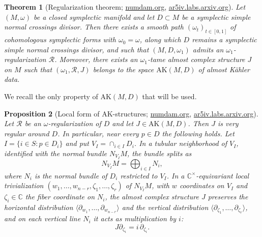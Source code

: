 \documentclass[11pt]{article}
\newtheorem{theorem}{Theorem}[section]
\newtheorem{proposition}[theorem]{Proposition}
\begin{document}
\begin{theorem}[Regularization theorem; {\rm\href{https://www.numdam.org/item/10.1016/j.crma.2018.02.009.pdf}{numdam.org}}, \href{https://ar5iv.labs.arxiv.org/html/2112.13125}{ar5iv.labs.arxiv.org}]\label{thm:reg}
Let $(M,\omega)$ be a closed symplectic manifold and let $D\subset M$ be a symplectic simple normal crossings divisor. Then there exists a smooth path $(\omega_t)_{t\in[0,1]}$ of cohomologous symplectic forms with $\omega_0=\omega$, along which $D$ remains a symplectic simple normal crossings divisor, and such that $(M,D,\omega_1)$ admits an $\omega_1$-regularization $\mathcal R$. Moreover, there exists an $\omega_1$-tame almost complex structure $J$ on $M$ such that $(\omega_1,\mathcal R,J)$ belongs to the space $\mathrm{AK}(M,D)$ of almost Kähler data.
\end{theorem}

We recall the only property of $\mathrm{AK}(M,D)$ that will be used.

\begin{proposition}[Local form of $\mathrm{AK}$-structures; {\rm\href{https://www.numdam.org/item/10.1016/j.crma.2018.02.009.pdf}{numdam.org}}, \href{https://ar5iv.labs.arxiv.org/html/2112.13125}{ar5iv.labs.arxiv.org}]\label{prop:localform}
Let $\mathcal R$ be an $\omega$-regularization of $D$ and let $J\in\mathrm{AK}(M,D)$. Then $J$ is very regular around $D$. In particular, near every $p\in D$ the following holds. Let $I=\{i\in S:p\in D_i\}$ and put $V_I=\cap_{i\in I}D_i$. In a tubular neighborhood of $V_I$, identified with the normal bundle $N_{V_I}M$, the bundle splits as
\[
N_{V_I}M=\bigoplus_{i\in I}N_i,
\]
where $N_i$ is the normal bundle of $D_i$ restricted to $V_I$. In a $\mathbb C^\times$-equivariant local trivialization $(w_1,\dots,w_{n-r},\zeta_1,\dots,\zeta_r)$ of $N_{V_I}M$, with $w$ coordinates on $V_I$ and $\zeta_i\in\mathbb C$ the fiber coordinate on $N_i$, the almost complex structure $J$ preserves the horizontal distribution $\langle\partial_{w_1},\dots,\partial_{w_{n-r}}\rangle$ and the vertical distribution $\langle\partial_{\zeta_1},\dots,\partial_{\zeta_r}\rangle$, and on each vertical line $N_i$ it acts as multiplication by $i$:
\[
J\partial_{\zeta_i}=i\,\partial_{\zeta_i}.
\]
\end{proposition}
\end{document}
